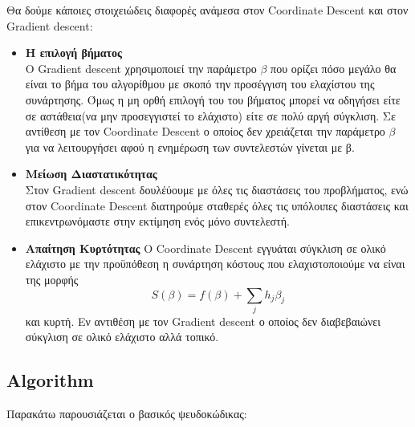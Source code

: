 \documentclass[12pt]{article}
\begin{document}
Θα δούμε κάποιες στοιχειώδεις διαφορές ανάμεσα στον \textlatin{Coordinate Descent} και στον \textlatin{Gradient descent}:
\begin{itemize}
    \item \textbf{Η επιλογή βήματος}\\
    Ο \textlatin{Gradient descent} χρησιμοποιεί την παράμετρο $\beta$ που ορίζει πόσο μεγάλο θα είναι το βήμα του αλγορίθμου με σκοπό την προσέγγιση του ελαχίστου της συνάρτησης. Όμως η μη ορθή επιλογή του του βήματος μπορεί να οδηγήσει είτε σε αστάθεια(να μην προσεγγιστεί το ελάχιστο) είτε σε πολύ αργή σύγκλιση. Σε αντίθεση με τον \textlatin{Coordinate Descent} ο οποίος δεν χρειάζεται την παράμετρο $\beta$ για να λειτουργήσει αφού η ενημέρωση των συντελεστών γίνεται με β.
    \item \textbf{Μείωση Διαστατικότητας}\\
    Στον \textlatin{Gradient descent} δουλέύουμε με όλες τις διαστάσεις του προβλήματος, ενώ στον \textlatin{Coordinate Descent} διατηρούμε σταθερές όλες τις υπόλοιπες διαστάσεις και επικεντρωνόμαστε στην εκτίμηση ενός μόνο συντελεστή.
    \item\textbf{Απαίτηση Κυρτότητας}
    Ο \textlatin{Coordinate Descent} εγγυάται σύγκλιση σε ολικό ελάχιστο με την προϋπόθεση η συνάρτηση κόστους που ελαχιστοποιούμε να είναι της μορφής \[S(\beta) = f(\beta) + \sum_{j} h_j\beta_j\] και κυρτή. Εν αντιθέση με τον \textlatin{Gradient descent} ο οποίος δεν διαβεβαιώνει σύκγλιση σε ολικό ελάχιστο αλλά τοπικό. 
\end{itemize}

\subsection{\textlatin{Algorithm}}
Παρακάτω παρουσιάζεται ο βασικός ψευδοκώδικας:

\end{document}
